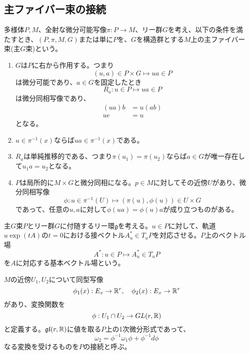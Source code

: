 \subsection{主ファイバー束の接続}
    \begin{dfn}[主ファイバー束]
        多様体$P, M$、全射な微分可能写像$\pi: P \rightarrow M$、リー群$G$を考え、以下の条件を満たすとき、$(P, \pi, M, G)$または単に$P$を、$G$を構造群とする$M$上の主ファイバー束(主$G$束)という。
        \begin{enumerate}
            \item $G$は$P$に右から作用する。つまり
                \[(u, a) \in P \times G \mapsto ua \in P\]
            は微分可能であり、$a \in G$を固定したとき
                \[R_a: u \in P \mapsto ua \in P\]
            は微分同相写像であり、
            \begin{align*}
                (ua)b &= u(ab)\\
                ue &= u
            \end{align*}
            となる。
            \item $u \in \pi^{-1}(x)$ならば$ua \in \pi^{-1}(x)$である。
            \item $R_a$は単純推移的である、つまり$\pi(u_1) = \pi(u_2)$ならば$a \in G$が唯一存在して$u_1a = u_2$となる。
            \item $P$は局所的に$M \times G$と微分同相になる。$p \in M$に対してその近傍$U$があり、微分同相写像
                \[\phi: u \in \pi^{-1}(U) \mapsto (\pi(u), \phi(u)) \in U \times G\]
            であって、任意の$u, a$に対して$\phi(ua) = \phi(u)a$が成り立つものがある。
        \end{enumerate}
    \end{dfn}

    \begin{dfn}[基本ベクトル場]
        主$G$束$P$とリー群$G$に付随するリー環$\mathfrak{g}$を考える。$u \in P$に対して、軌道$u\exp(tA)$の$t = 0$における接ベクトル$A^*_u \in T_uP$を対応させる。$P$上のベクトル場
            \[A^*: u \in P \mapsto A^*_u \in T_uP\]
        を$A$に対応する基本ベクトル場という。
    \end{dfn}

    \begin{dfn}[接続(主ファイバー束)]
        $M$の近傍$U_1, U_2$について同型写像
            \[\phi_1(x): E_x \rightarrow \mathbb{R}^r, \quad \phi_2(x): E_x \rightarrow \mathbb{R}^r\]
        があり、変換関数を
            \[\phi: U_1 \cap U_2 \rightarrow GL(r, \mathbb{R})\]
        と定義する。$\mathfrak{gl}(r, \mathbb{R})$に値を取る$P$上の1次微分形式であって、
            \[\omega_2 = \phi^{-1}\omega_1\phi + \phi^{-1}d\phi\]
        なる変換を受けるものを$P$の接続と呼ぶ。
    \end{dfn}

